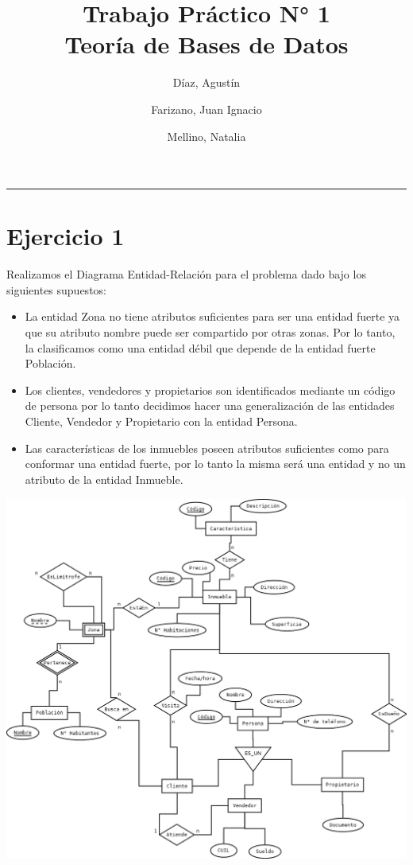 \documentclass[11pt, fleqn]{article}
\title{%
    Trabajo Práctico N° 1 \\
    \large Teoría de Bases de Datos}
\author{Díaz, Agustín \and Farizano, Juan Ignacio \and Mellino, Natalia} %
\date{}
\begin{document}
\maketitle
\noindent\rule{\textwidth}{1pt}

\section*{Ejercicio 1}

Realizamos el Diagrama Entidad-Relación para el problema dado bajo los siguientes supuestos: 

\begin{itemize} 
    \item La entidad Zona no tiene atributos suficientes para ser una entidad fuerte
          ya que su atributo nombre puede ser compartido por otras zonas. Por lo tanto, 
          la clasificamos como una entidad débil que depende de la entidad fuerte Población.
    \item Los clientes, vendedores y propietarios son identificados mediante un código de persona
          por lo tanto decidimos hacer una generalización de las entidades
          Cliente, Vendedor y Propietario con la entidad Persona.
    \item Las características de los inmuebles poseen atributos suficientes como para conformar una
          entidad fuerte, por lo tanto la misma será una entidad y no un atributo de la entidad Inmueble. 
\end{itemize}

\includegraphics[width=15cm, height=12cm]{DER.png}
\end{document}
